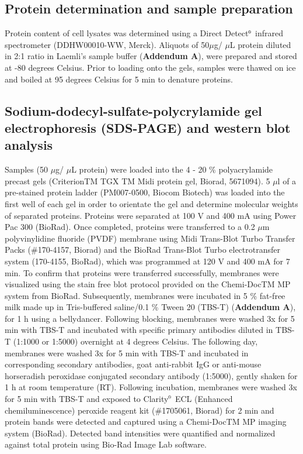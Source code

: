 \subsection{Protein determination and sample preparation}
Protein content of cell lysates was determined using a Direct Detect${\textsuperscript{\tiny{\textregistered}}}$ infrared spectrometer (DDHW00010-WW, Merck). Aliquots of 50$\mu$g/ $\mu$L protein diluted in 2:1 ratio in Laemli’s sample buffer (\textbf{Addendum A}), were prepared and stored at -80 degrees Celsius. Prior to loading onto the gels, samples were thawed on ice and boiled at 95 degrees Celsius for 5 min to denature proteins.

\subsection{Sodium-dodecyl-sulfate-polycrylamide gel electrophoresis (SDS-PAGE) and western blot analysis}\label{sec:SDS_PAGE}
Samples (50 $\mu$g/ $\mu$L protein) were loaded into the 4 - 20 \% polyacrylamide precast gels (CriterionTM TGX TM Midi protein gel, Biorad, 5671094). 5 $\mu$l of a pre-stained protein ladder (PM007-0500, Biocom Biotech) was loaded into the first well of each gel in order to orientate the gel and determine molecular weights of separated proteins. Proteins were separated at 100 V and 400 mA using Power Pac 300 (BioRad). Once completed, proteins were transferred to a 0.2 $\mu$m polyvinylidine fluoride (PVDF) membrane using Midi Trans-Blot Turbo Transfer Packs (\#170-4157, Biorad) and the BioRad Trans-Blot Turbo electrotransfer system (170-4155, BioRad), which was programmed at 120 V and 400 mA for 7 min. To confirm that proteins were transferred successfully, membranes were visualized using the stain free blot protocol provided on the Chemi-DocTM MP system from BioRad. Subsequently, membranes were incubated in 5 \% fat-free milk made up in Tris-buffered saline/0.1 \% Tween 20 (TBS-T) (\textbf{Addendum A}), for 1 h using a bellydancer. Following blocking, membranes were washed 3x for 5 min with TBS-T and incubated with specific primary antibodies diluted in TBS-T (1:1000 or 1:5000) overnight at 4 degrees Celsius. The following day, membranes were washed 3x for 5 min with TBS-T and incubated in corresponding secondary antibodies, goat anti-rabbit IgG or anti-mouse horseradish peroxidase conjugated secondary antibody (1:5000), gently shaken for 1 h at room temperature (RT). Following incubation, membranes were washed 3x for 5 min with TBS-T and exposed to Clarity${\textsuperscript{\tiny{\textregistered}}}$ ECL (Enhanced chemiluminescence) peroxide reagent kit (\#1705061, Biorad) for 2 min and protein bands were detected and captured using a Chemi-DocTM MP imaging system (BioRad). Detected band intensities were quantified and normalized against total protein using Bio-Rad Image Lab software.

